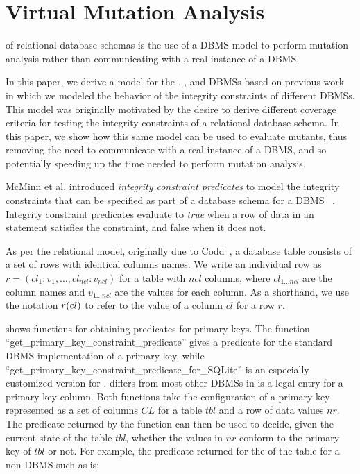 


\vspace{-1ex}
\section{Virtual Mutation Analysis}
\label{sec:virtual-mutation-analysis}

\VMA of relational database schemas is the use of a DBMS model to perform mutation analysis rather than communicating with a real instance of a DBMS.

In this paper, we derive a model for the \HyperSQL, \Postgres, and \SQLite DBMSs based on previous work \cite{McMinn2015} in which we modeled the behavior of the integrity constraints of different DBMSs. This model was originally motivated by the desire to derive different coverage criteria for testing the integrity constraints of a relational database schema. In this paper, we show how this same model can be used to evaluate mutants, thus removing the need to communicate with a real instance of a DBMS, and so potentially speeding up the time needed to perform mutation analysis.



McMinn et al. introduced {\it integrity constraint predicates} to model the integrity constraints that can be specified as part of a database schema for a DBMS~\cite{McMinn2015} . Integrity constraint predicates evaluate to {\it true} when a row of data in an \INSERT statement satisfies the constraint, and false when it does not.

As per the relational model, originally due to Codd~\cite{Codd1970}, a database table consists of a set of rows with identical columns names. We write an individual row as $r = (cl_1:v_1, \dots, cl_{ncl}:v_{ncl})$ for a table with $ncl$ columns, where $cl_{1 \ldots ncl}$ are the column names and $v_{1 \ldots ncl}$ are the values for each column. As a shorthand, we use the notation $r (cl)$ to refer to the value of a column $cl$ for a row $r$.

\begin{sloppypar}
 shows functions for obtaining predicates for primary keys. The function
``get\_primary\_key\_constraint\_predicate'' gives a predicate for the standard DBMS implementation of a primary key,
while ``get\_primary\_key\_constraint\_predicate\_for\_SQLite'' is an especially customized version for \SQLite. \SQLite
differs from most other DBMSs in \NULL is a legal entry for a primary key column. Both functions take the
configuration of a primary key represented as a set of columns $CL$ for a table $tbl$ and a row of data values $nr$. The
predicate returned by the function can then be used to decide, given the current state of the table $tbl$, whether the
values in $nr$ conform to the primary key of $tbl$ or not. For example, the predicate returned for the \PK of the
 table for a non-\SQLite DBMS such as \Postgres is:
\end{sloppypar}

